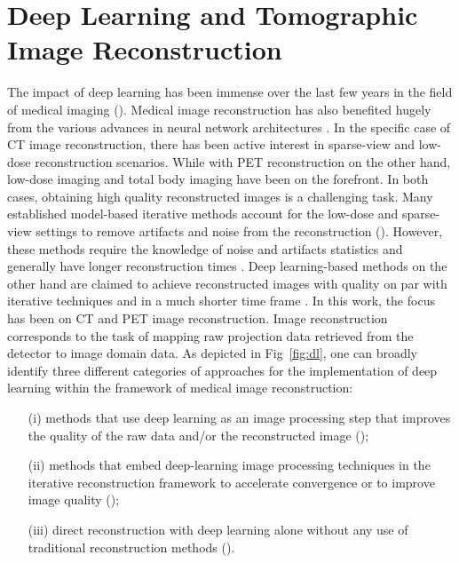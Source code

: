 
\chapter{Deep Learning and Tomographic Image Reconstruction} %

\label{Chapter2} %

The impact of deep learning has been immense over the last few years in the field of medical imaging (\cite{litjens2017survey, greenspan2016guest}). Medical image reconstruction has also benefited hugely from the various advances in neural network architectures \cite{wang2020deep,yedder2021deep,reader2020deep}. In the specific case of \ac{CT} image reconstruction, there has been active interest in sparse-view and low-dose reconstruction scenarios. While with \ac{PET} reconstruction on the other hand, low-dose imaging and total body imaging have been on the forefront. In both cases, obtaining high quality reconstructed images is a challenging task. Many established model-based iterative methods account for the low-dose and sparse-view settings to remove artifacts and noise from the reconstruction (\cite{nuyts1998iterative,Elbakri2002,liu2013total}). However, these methods require the knowledge of noise and artifacts statistics and generally have longer reconstruction times \cite{kim2014combining}. Deep learning-based methods on the other hand are claimed to achieve reconstructed images with quality on par with iterative techniques and in a much shorter time frame \cite{leuschner2021quantitative}. In this work, the focus has been on \ac{CT} and \ac{PET} image reconstruction. 
Image reconstruction corresponds to the task of mapping raw projection data retrieved from the detector to image domain data. As depicted in Fig~\ref{fig:dl}, one can broadly identify three different categories of approaches for the implementation of deep learning within the framework of medical image reconstruction:
\begin{itemize}
	\item[(i)] methods that use deep learning as an image processing step that improves the quality of the raw data and/or the reconstructed image (\cite{gong2018pet, maier2018deep}); 
	\item[(ii)] methods that embed deep-learning image processing techniques in the iterative reconstruction framework to accelerate convergence or to improve image quality (\cite{xie2019generative,kim2018penalized,gong2019iterative});
	\item[(iii)] direct reconstruction with deep learning alone without any use of traditional reconstruction methods  (\cite{whiteley2019direct,zhu2018image,haeggstroem2018deeprec}).
\end{itemize}


